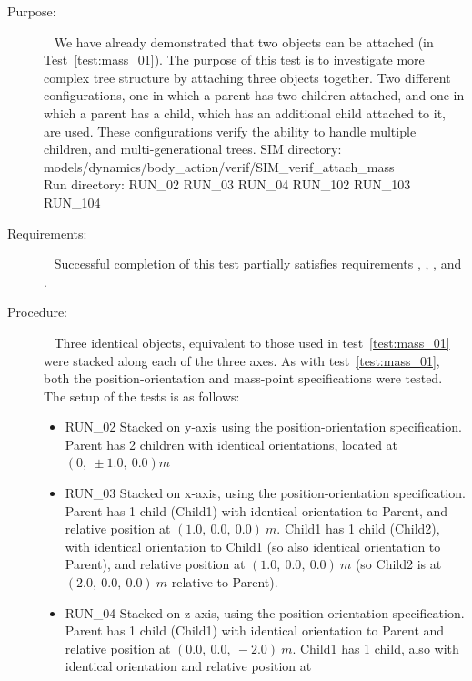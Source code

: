 \label{test:mass_02}
\begin{description}
\item[Purpose:] \ \newline
We have already demonstrated that two objects can be attached (in 
Test~\ref{test:mass_01}).  The purpose of this test is to investigate more 
complex tree structure by attaching three objects together.  Two different 
configurations, one in which a parent has two children attached, and one in 
which a parent has a child, which has an additional child attached to it, are 
used.  These configurations verify the ability to handle multiple children, 
and multi-generational trees.
\newline
SIM directory: models/dynamics/body\_action/verif/SIM\_verif\_attach\_mass\\
Run directory: RUN\_02 RUN\_03 RUN\_04  RUN\_102 RUN\_103 RUN\_104
\item[Requirements:] \ \newline
Successful completion of this test partially satisfies
requirements , , 
, and .
\item[Procedure:]\ \newline
Three identical objects, equivalent to those used in 
test~\ref{test:mass_01} were stacked along each of the three axes.  As with 
test~\ref{test:mass_01}, both the position-orientation and mass-point 
specifications were tested.  The setup of the tests is as follows:
\begin{itemize}
 \item RUN\_02 Stacked on y-axis using the position-orientation specification.
 Parent 
 has 2 children with identical orientations, located at $(0,~\pm1.0,~0.0) m$
 \item RUN\_03 Stacked on x-axis, using the position-orientation 
 specification.  Parent 
 has 1 child (Child1) with identical orientation to Parent, and relative 
 position at $(1.0,~0.0,~0.0)~m$.
 Child1 has 1 child (Child2), with identical orientation to Child1 (so also 
 identical orientation to Parent), and relative position at 
 $(1.0,~0.0,~0.0)~m$ (so Child2 is at $(2.0,~0.0,~0.0)~m$ relative to Parent).
 \item RUN\_04 Stacked on z-axis, using the position-orientation 
 specification. Parent 
 has 1 child (Child1) with identical orientation to Parent and relative 
 position at $(0.0,~0.0,~-2.0)~m$.  
 Child1 has 1 child, also with identical orientation and relative position at 

\end{itemize}
\end{description}
